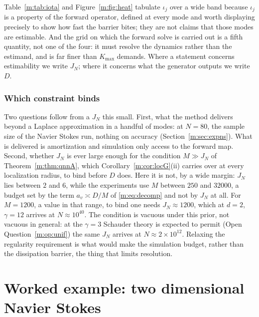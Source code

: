 Table~\ref{m:tab:iota} and Figure~\ref{m:fig:heat} tabulate $\iota_j$ over a wide band because $\iota_j$ is a property of the forward operator, defined at every mode and worth displaying precisely to show how fast the barrier bites; they are not claims that those modes are estimable. And the grid on which the forward solve is carried out is a fifth quantity, not one of the four: it must resolve the dynamics rather than the estimand, and is far finer than $K_{\max}$ demands. Where a statement concerns estimability we write $J_N$; where it concerns what the generator outputs we write $D$.

\subsubsection{Which constraint binds} Two questions follow from a $J_N$ this small. First, what the method delivers beyond a Laplace approximation in a handful of modes: at $N=80$, the sample size of the Navier Stokes run, nothing on accuracy (Section~\ref{m:sec:expns}). What is delivered is amortization and simulation only access to the forward map. Second, whether $J_N$ is ever large enough for the condition $M\gg J_N$ of Theorem~\ref{m:thm:qnnA}, which Corollary~\ref{m:cor:locG}(ii) carries over at every localization radius, to bind before $D$ does. Here it is not, by a wide margin: $J_N$ lies between $2$ and $6$, while the experiments use $M$ between $250$ and $32000$, a budget set by the term $a_v\asymp D/M$ of \eqref{m:eq:decomp} and not by $J_N$ at all. For $M=1200$, a value in that range, to bind one needs $J_N\approx1200$, which at $d=2$, $\gamma=12$ arrives at $N\approx10^{40}$. The condition is vacuous under this prior, not vacuous in general: at the $\gamma=3$ Schauder theory is expected to permit (Open Question~\ref{m:op:unif}) the same $J_N$ arrives at $N\approx2\times10^{12}$. Relaxing the regularity requirement is what would make the simulation budget, rather than the dissipation barrier, the thing that limits resolution.

\section{Worked example: two dimensional Navier Stokes}\label{m:sec:ns}

